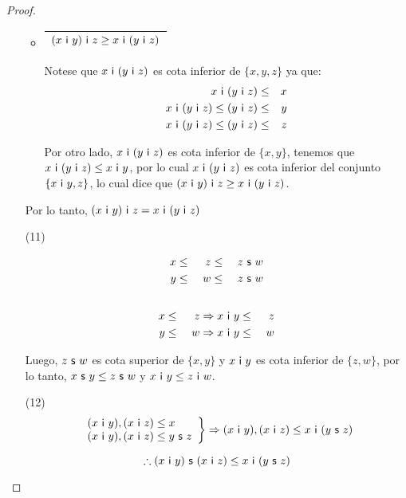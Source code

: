 \begin{proof}
\begin{enumerate}
\begin{itemize}
          \item \begin{tabular}{|c|} \hline $(x \ \mathsf{i} \ y) \ \mathsf{i} \ z \geq x \ \mathsf{i} \ (y \ \mathsf{i} \ z)$\\\hline \end{tabular}
            \PN Notese que $x \ \IN \ (y \ \IN \ z)$ es cota inferior de $\{x, y, z\}$ ya que:
            \begin{eqnarray*}
              x \ \mathsf{i} \ (y \ \mathsf{i} \ z) &\leq& x \\
              x \ \mathsf{i} \ (y \ \mathsf{i} \ z) \leq (y \ \mathsf{i} \ z) &\leq& y \\
              x \ \mathsf{i} \ (y \ \mathsf{i} \ z) \leq (y \ \mathsf{i} \ z) &\leq& z
            \end{eqnarray*}

            \PN Por otro lado, $x \ \IN \ (y \ \IN \ z)$ es cota inferior de $\{x, y\}$, tenemos que $x \ \mathsf{i} \ (y \ \mathsf{i}
            \ z) \leq x \ \mathsf{i} \ y$, por lo cual $x \ \IN \ (y \ \IN \ z)$ es cota inferior del conjunto $\{x \ \mathsf{i} \ y,
            z\}$, lo cual dice que $(x \ \mathsf{i} \ y) \ \mathsf{i} \ z \geq x \ \mathsf{i} \ (y \ \mathsf{i} \ z)$.
        \end{itemize}

        \PN Por lo tanto, $(x \ \mathsf{i} \ y) \ \mathsf{i} \ z = x \ \mathsf{i} \ (y \ \mathsf{i} \ z)$

      \item[(11)]
        \begin{multicols}{2}
          \begin{alignat*}{3}
            x &\leq& \ z &\leq& \ z \ \SU \ w \\
            y &\leq& \ w &\leq& \ z \ \SU \ w \\
          \end{alignat*}
          \begin{alignat*}{3}
            \\
            x &\leq& \ z \Rightarrow x \ \IN \ y &\leq& \ z \\
            y &\leq& \ w \Rightarrow x \ \IN \ y &\leq& \ w
          \end{alignat*}
        \end{multicols}
        \PN Luego, $z \ \mathsf{s} \ w$ es cota superior de $\{x, y\}$ y $x \ \mathsf{i} \ y$ es cota inferior de $\{z, w\}$, por lo
        tanto, $x \ \SU \ y \leq z \ \SU \ w$ y $x \ \IN \ y \leq z \ \IN \ w$.

      \item[(12)]
        \begin{equation*}
          \left.
          \begin{array}{l}
            (x \ \mathsf{i} \ y), (x \ \mathsf{i} \ z) \leq x \\
            (x \ \mathsf{i} \ y), (x \ \mathsf{i} \ z) \leq y \ \mathsf{s} \ z
          \end{array}
          \right \rbrace \Rightarrow (x \ \mathsf{i} \ y), (x \ \mathsf{i} \ z) \leq x \ \mathsf{i} \ (y \ \mathsf{s} \ z)
        \end{equation*}

        \[
          \therefore (x \ \IN \ y) \ \SU \ (x \ \IN \ z) \leq x \ \IN \ (y \ \SU \ z)
        \]
    \end{enumerate}
  \end{proof}
